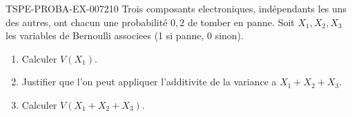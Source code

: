 \begin{exercice}{TSPE-PROBA-EX-007}{2}{10}
Trois composants electroniques, indépendants les uns des autres, ont chacun une probabilité $0{,}2$ de tomber en panne. Soit $X_1,X_2,X_3$ les variables de Bernoulli associees (1 si panne, 0 sinon).
\begin{enumerate}
  \item Calculer $V(X_1)$.
  \item Justifier que l'on peut appliquer l'additivite de la variance a $X_1+X_2+X_3$.
  \item Calculer $V(X_1+X_2+X_3)$.
\end{enumerate}
\end{exercice}
